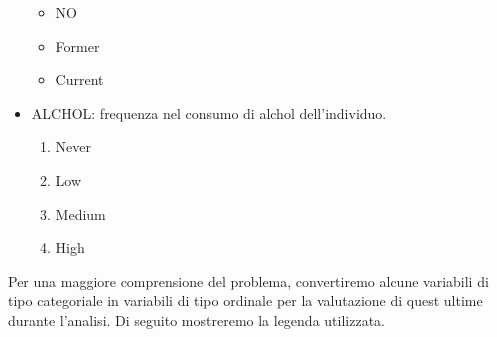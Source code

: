 \documentclass{article}\usepackage[]{graphicx}\usepackage[]{xcolor}
\begin{document}
\begin{itemize}
\begin{itemize}
          \item NO 
          \item Former
          \item Current
        \end{itemize}
      \item ALCHOL: frequenza nel consumo di alchol dell'individuo.
        \begin{enumerate}
          \item Never 
          \item Low
          \item Medium
          \item High
        \end{enumerate}
    \end{itemize}
  
    Per una maggiore comprensione del problema, convertiremo alcune variabili di
    tipo categoriale in variabili di tipo ordinale per la valutazione di 
    quest ultime durante l'analisi.
    Di seguito mostreremo la legenda utilizzata.
    
\end{document}
